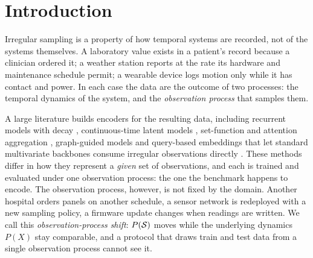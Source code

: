 
\section{Introduction}
Irregular sampling is a property of how temporal systems are recorded, not of the systems themselves. A
laboratory value exists in a patient's record because a clinician ordered it; a weather station reports at the
rate its hardware and maintenance schedule permit; a wearable device logs motion only while it has contact and
power. In each case the data are the outcome of two processes: the temporal dynamics of the system, and the
\emph{observation process} that samples them.

A large literature builds encoders for the resulting data, including recurrent models with decay
\cite{che2018grud}, continuous-time latent models \cite{rubanova2019latentode,debrouwer2019gruodebayes,kidger2020ncde},
set-function and attention aggregation \cite{horn2020seft,shukla2021mtand}, graph-guided models
\cite{zhang2022raindrop,zhang2024tpatchgnn} and query-based embeddings that let standard multivariate backbones
consume irregular observations directly \cite{lim2026quite}. These methods differ in how they represent a
\emph{given} set of observations, and each is trained and evaluated under one observation process: the one the
benchmark happens to encode. The observation process, however, is not fixed by the domain. Another hospital
orders panels on another schedule, a sensor network is redeployed with a new sampling policy, a firmware update
changes when readings are written. We call this \emph{observation-process shift}: $P(\mathcal{S})$ moves while the
underlying dynamics $P(X)$ stay comparable, and a protocol that draws train and test data from a single
observation process cannot see it.

